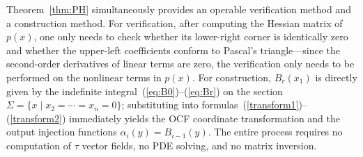 \documentclass[11pt]{article}
\begin{document}
%	

Theorem~\ref{thm:PH} simultaneously provides an operable verification method and a construction method. For verification, after computing the Hessian matrix of $p(x)$, one only needs to check whether its lower-right corner is identically zero and whether the upper-left coefficients conform to Pascal's triangle---since the second-order derivatives of linear terms are zero, the verification only needs to be performed on the nonlinear terms in $p(x)$. For construction, $B_r(x_1)$ is directly given by the indefinite integral~(\ref{eq:B0})--(\ref{eq:Br}) on the section $\Sigma = \{x\mid x_2=\cdots=x_n=0\}$; substituting into formulas~(\ref{transform1})--(\ref{transform2}) immediately yields the OCF coordinate transformation and the output injection functions $\alpha_i(y)=B_{i-1}(y)$. The entire process requires no computation of $\tau$ vector fields, no PDE solving, and no matrix inversion.
\end{document}
